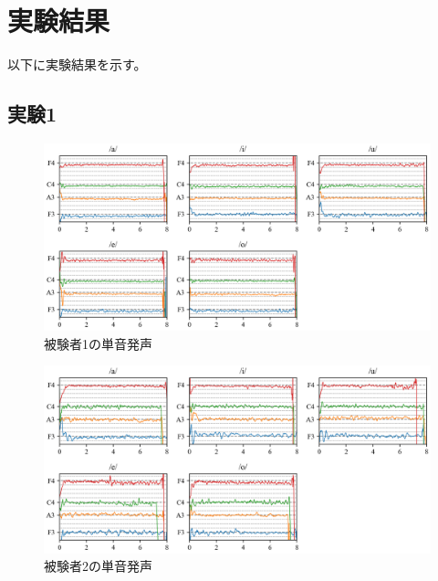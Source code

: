 \documentclass[10ptj,a4j,dvipdfmx,uplatex, oneside, openany]{jsbook}%
\begin{document}
\section{実験結果}
以下に実験結果を示す。


\subsection{実験1}


\begin{figure}[htbp]
    \begin{center}
      \includegraphics[clip,width=16.0cm]{F0_long_1.png}
      \caption{被験者1の単音発声}
      \label{fig:1}
    \end{center}
\end{figure}

\begin{figure}[htbp]
    \begin{center}
      \includegraphics[clip,width=16.0cm]{F0_long_2.png}
      \caption{被験者2の単音発声}
      \label{fig:2}
    \end{center}
\end{figure}
\end{document}
